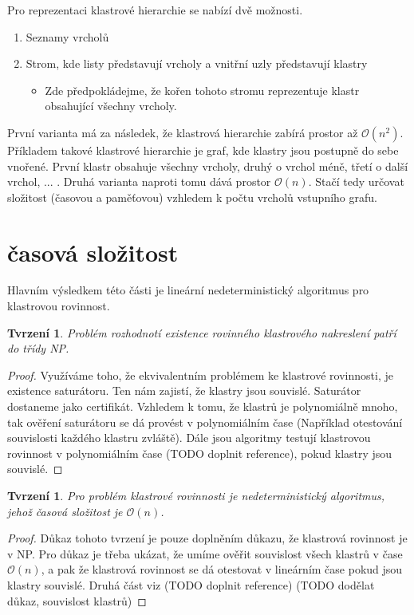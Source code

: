 \documentclass[12pt,a4report]{report}
\newtheorem{tvr2}{Tvrzení}
\newtheorem{tvr3}{Tvrzení}
\begin{document}
Pro reprezentaci klastrové hierarchie se nabízí dvě možnosti.
\begin{enumerate}
\item Seznamy vrcholů
\item Strom, kde listy představují vrcholy a vnitřní uzly představují klastry
\begin{itemize}
\item Zde předpokládejme, že kořen tohoto stromu reprezentuje klastr obsahující všechny vrcholy.
\end{itemize}
\end{enumerate}

První varianta má za následek, že klastrová hierarchie zabírá prostor až $\mathcal{O}(n^2)$. Příkladem takové klastrové hierarchie je graf, kde klastry jsou postupně do sebe vnořené. První klastr obsahuje všechny vrcholy, druhý o vrchol méně, třetí o další vrchol, ... .
Druhá varianta naproti tomu dává prostor $\mathcal{O}(n)$. Stačí tedy určovat složitost (časovou a paměťovou) vzhledem k počtu vrcholů vstupního grafu.

\section{časová složitost}
Hlavním výsledkem této části je lineární nedeterministický algoritmus pro klastrovou rovinnost.
\begin{tvr2}
Problém rozhodnotí existence rovinného klastrového nakreslení patří do třídy NP.
\end{tvr2}
\begin{proof}
Využíváme toho, že ekvivalentním problémem ke klastrové rovinnosti, je existence saturátoru. Ten nám zajistí, že klastry jsou souvislé. Saturátor dostaneme jako certifikát. Vzhledem k tomu, že klastrů je polynomiálně mnoho, tak ověření saturátoru se dá provést  v polynomiálním čase (Například otestování souvislosti každého klastru zvláště). Dále jsou algoritmy testují klastrovou rovinnost v polynomiálním čase (TODO doplnit reference), pokud klastry jsou souvislé. 
\end{proof}

\begin{tvr3}
Pro problém klastrové rovinnosti je nedeterministický algoritmus, jehož časová složitost je $\mathcal{O}(n)$.
\end{tvr3}
\begin{proof}
Důkaz tohoto tvrzení je pouze doplněním důkazu, že klastrová rovinnost je v NP. Pro důkaz je třeba ukázat, že umíme ověřit souvislost všech klastrů v čase $\mathcal{O}(n)$, a pak že klastrová rovinnost se dá otestovat v lineárním čase pokud jsou klastry souvislé.
Druhá část viz (TODO doplnit reference)
(TODO dodělat důkaz, souvislost klastrů)
\end{proof}
\end{document}
